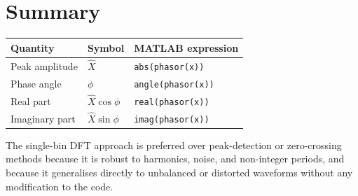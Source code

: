 \documentclass[11pt,a4paper]{article}
\begin{document}
\section{Summary}

\begin{center}
\begin{tabular}{@{}lll@{}}
  \toprule
  Quantity & Symbol & MATLAB expression \\
  \midrule
  Peak amplitude   & $\hat{X}$              & \texttt{abs(phasor(x))} \\
  Phase angle      & $\phi$                 & \texttt{angle(phasor(x))} \\
  Real part        & $\hat{X}\cos\phi$      & \texttt{real(phasor(x))} \\
  Imaginary part   & $\hat{X}\sin\phi$      & \texttt{imag(phasor(x))} \\
  \bottomrule
\end{tabular}
\end{center}

The single-bin DFT approach is preferred over peak-detection or zero-crossing
methods because it is robust to harmonics, noise, and non-integer periods, and
because it generalises directly to unbalanced or distorted waveforms without
any modification to the code.
\end{document}
